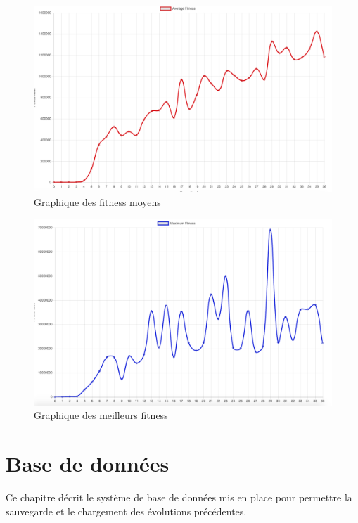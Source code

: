 \documentclass{article}
\begin{document}
\begin{figure}[H]
\begin{center}
	\includegraphics[scale=0.3]{avgfitgraph.png}
	\caption{Graphique des fitness moyens}
\end{center}
\end{figure}

\begin{figure}[H]
\begin{center}
	\includegraphics[scale=0.3]{maxfitgraph.png}
	\caption{Graphique des meilleurs fitness}
\end{center}
\end{figure}

\newpage
\section{Base de données}

Ce chapitre décrit le système de base de données mis en place pour  permettre la sauvegarde et le chargement des évolutions précédentes.\\
\end{document}
